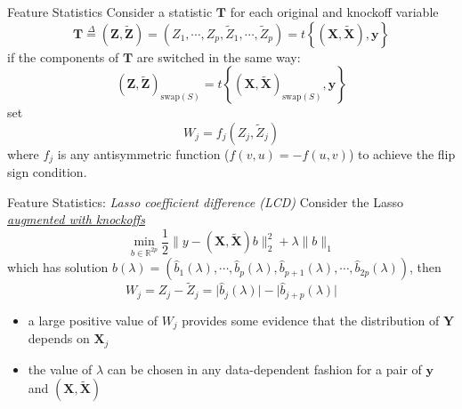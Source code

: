     \begin{frame}{Feature Statistics}
        Consider a statistic $\mathbf{T}$ for each original and knockoff variable $$ \mathbf{T} \overset{\Delta}{=} (\mathbf{Z},\tilde{\mathbf{Z}}) = (Z_1,\cdots,Z_p,\tilde{Z}_1,\cdots,\tilde{Z}_p) = t\left\{ (\mathbf{X},\tilde{\mathbf{X}}), \mathbf{y}\right\} $$
        if the components of $\mathbf{T}$ are switched in the same way: $$ (\mathbf{Z},\tilde{\mathbf{Z}})_{\mathrm{swap}(S)} = t\left\{ (\mathbf{X},\tilde{\mathbf{X}})_{\mathrm{swap}(S)},\mathbf{y} \right\} $$
        set $$W_j = f_j(Z_j,\tilde{Z}_j)$$ where $f_j$ is any antisymmetric function (\underline{$f(v,u)=-f(u,v)$}) to achieve the flip sign condition.
    \end{frame}

    \begin{frame}{Feature Statistics: \textit{Lasso coefficient difference (LCD)}}
        Consider the Lasso \textit{\underline{augmented with \textcolor{glaucous!65!white}{knockoffs}}} 
        $$
        \min_{b\in\mathbb{R}^{2p}}\frac{1}{2}\lVert y - (\mathbf{X},\tilde{\mathbf{X}})b \rVert^2_2 + \lambda \lVert b \rVert _1
        $$
        which has solution $ \hat{b}(\lambda) = (\hat{b}_1(\lambda),\cdots,\hat{b}_p(\lambda),\hat{b}_{p+1}(\lambda),\cdots,\hat{b}_{2p}(\lambda)) $, then
        $$
        W_j = Z_j -\tilde{Z}_j = \lvert \hat{b}_j(\lambda) \rvert - \lvert \hat{b}_{j+p}(\lambda) \rvert
        $$

        \vspace*{5pt}
        {\small
        \begin{itemize}
            \item<2-> a large positive value of $W_j$ provides some evidence that the distribution of $\mathbf{Y}$ depends on $\mathbf{X}_j$
            \item<3-> the value of $\lambda$ can be chosen in any data-dependent fashion for a pair of $\mathbf{y}$ and $(\mathbf{X},\tilde{\mathbf{X}})$ 
        \end{itemize}
        }
        
    \end{frame}


